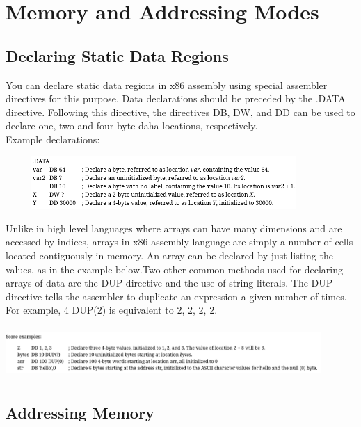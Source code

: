 \documentclass[12pt]{extarticle}
\begin{document}
 \section{Memory and Addressing Modes}

 \subsection{Declaring Static Data Regions}

 You can declare static data regions in x86 assembly using special assembler directives for this purpose.
 Data declarations should be preceded by the .DATA directive. Following this directive, the directives DB, DW, and DD
 can be used to declare one, two and four byte daha locations, respectively. \\

 Example declarations:

 \begin{center}

    \includegraphics[width=12cm, height=2cm]{dec}

    
 \end{center}

 Unlike in high level languages where arrays can have many dimensions and are accessed by indices, arrays in x86 assembly language are simply a number of cells located 
 contiguously in memory. An array can be declared by just listing the values, as in the example below.Two other common methods used for declaring arrays of data are the DUP directive and the use of string literals. The DUP directive tells the assembler to duplicate an expression a given number of times. For example, 4 DUP(2) is equivalent to 2, 2, 2, 2. 

 \begin{center}

    \includegraphics[width=12cm, height=2cm]{dec1}

    
 \end{center}

 \subsection{Addressing Memory}
\end{document}
